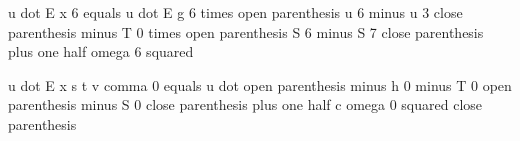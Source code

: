 u dot E x 6 equals u dot E g 6 times open parenthesis u 6 minus u 3 close parenthesis minus T 0 times open parenthesis S 6 minus S 7 close parenthesis plus one half omega 6 squared  

u dot E x s t v comma 0 equals u dot open parenthesis minus h 0 minus T 0 open parenthesis minus S 0 close parenthesis plus one half c omega 0 squared close parenthesis
